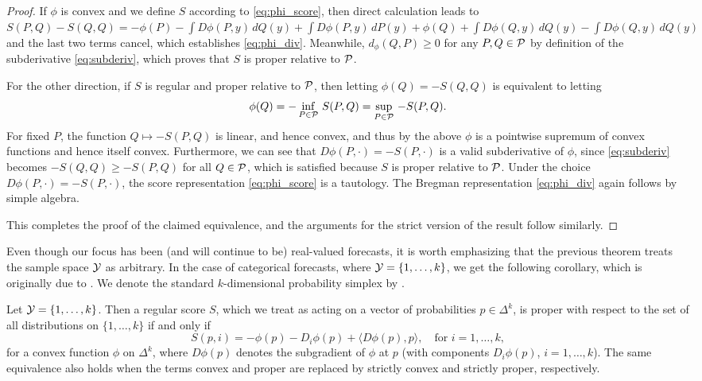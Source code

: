 \documentclass{article}
\begin{document}
\begin{proof}
If $\phi$ is convex and we define $S$ according to \eqref{eq:phi_score}, then
direct calculation leads to $S(P,Q) - S(Q,Q) = -\phi(P) - \int D\phi(P, y) \,
dQ(y) + \int D\phi(P, y) \, dP(y) + \phi(Q) + \int D\phi(Q, y) \, dQ(y) - \int
D\phi(Q, y) \, dQ(y)$ and the last two terms cancel, which establishes 
\eqref{eq:phi_div}. Meanwhile, $d_\phi(Q, P) \geq 0$ for any $P,Q \in \mathcal{P}$ by
definition of the subderivative \eqref{eq:subderiv}, which proves that $S$ is
proper relative to $\mathcal{P}$.  

For the other direction, if $S$ is regular and proper relative to $\mathcal{P}$, then
letting $\phi(Q) = -S(Q, Q)$ is equivalent to letting  
\[
\phi(Q) = -\inf_{P \in \mathcal{P}} \, S(P, Q) = \sup_{P \in \mathcal{P}} \, -S(P, Q).
\]
For fixed $P$, the function $Q \mapsto -S(P, Q)$ is linear, and hence convex,
and thus by the above $\phi$ is a pointwise supremum of convex functions and
hence itself convex. Furthermore, we can see that $D\phi(P, \cdot) = -S(P,
\cdot)$ is a valid subderivative of $\phi$, since \eqref{eq:subderiv} becomes 
$-S(Q, Q) \geq -S(P, Q)$ for all $Q \in \mathcal{P}$, which is satisfied because $S$ is 
proper relative to $\mathcal{P}$. Under the choice $D\phi(P, \cdot) = -S(P, \cdot)$, the 
score representation \eqref{eq:phi_score} is a tautology. The Bregman
representation \eqref{eq:phi_div} again follows by simple algebra. 

This completes the proof of the claimed equivalence, and the arguments for the
strict version of the result follow similarly.
\end{proof}

Even though our focus has been (and will continue to be) real-valued forecasts,
it is worth emphasizing that the previous theorem treats the sample space $\mathcal{Y}$
as arbitrary. In the case of categorical forecasts, where $\mathcal{Y} = \{1,\dots,k\}$,
we get the following corollary, which is originally due to 
\citet{savage1971elicitation}. We denote the standard $k$-dimensional 
probability simplex by .

\begin{corollary}
Let $\mathcal{Y} = \{1,\dots,k\}$. Then a regular score $S$, which we treat as acting on
a vector of probabilities $p \in \Delta^k$, is proper with respect to the set of
all distributions on $\{1,\dots,k\}$ if and only if 
\[
S(p, i) = -\phi(p) - D_i\phi(p) + \langle D\phi(p), p \rangle , \quad \text{for
  $i=1,\dots,k$},
\]
for a convex function $\phi$ on $\Delta^k$, where $D\phi(p)$ denotes the
subgradient of $\phi$ at $p$ (with components $D_i\phi(p)$, $i=1,\dots,k$). The
same equivalence also holds when the terms convex and proper are replaced by
strictly convex and strictly proper, respectively.     
\end{corollary}
\end{document}
